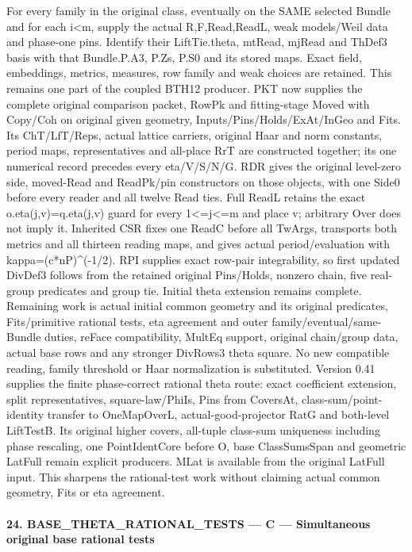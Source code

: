 \documentclass[11pt,a4paper]{article}
\numberwithin{equation}{section}
\theoremstyle{remark}\newtheorem{remark}[theorem]{Remark}
\begin{document}
For every family in the original class, eventually on the SAME selected Bundle and for each i<m, supply the actual R,F,Read,ReadL, weak models/Weil data and phase-one pins. Identify their LiftTie.theta, mtRead, mjRead and ThDef3 basis with that Bundle.P.A3, P.Zs, P.S0 and its stored maps. Exact field, embeddings, metrics, measures, row family and weak choices are retained. This remains one part of the coupled BTH12 producer. PKT now supplies the complete original comparison packet, RowPk and fitting-stage Moved with Copy/Coh on original given geometry, Inputs/Pins/Holds/ExAt/InGeo and Fits. Its ChT/LfT/Reps, actual lattice carriers, original Haar and norm constants, period maps, representatives and all-place RrT are constructed together; its one numerical record precedes every eta/V/S/N/G. RDR gives the original level-zero side, moved-Read and ReadPk/pin constructors on those objects, with one Side0 before every reader and all twelve Read ties. Full ReadL retains the exact o.eta(j,v)=q.eta(j,v) guard for every 1<=j<=m and place v; arbitrary Over does not imply it. Inherited CSR fixes one ReadC before all TwArgs, transports both metrics and all thirteen reading maps, and gives actual period/evaluation with kappa=(c*nP)\textasciicircum{}(-1/2). RPI supplies exact row-pair integrability, so first updated DivDef3 follows from the retained original Pins/Holds, nonzero chain, five real-group predicates and group tie. Initial theta extension remains complete. Remaining work is actual initial common geometry and its original predicates, Fits/primitive rational tests, eta agreement and outer family/eventual/same-Bundle duties, reFace compatibility, MultEq support, original chain/group data, actual base rows and any stronger DivRows3 theta square. No new compatible reading, family threshold or Haar normalization is substituted. Version 0.41 supplies the finite phase-correct rational theta route: exact coefficient extension, split representatives, square-law/PhiIs, Pins from CoversAt, class-sum/point-identity transfer to OneMapOverL, actual-good-projector RatG and both-level LiftTestB. Its original higher covers, all-tuple class-sum uniqueness including phase rescaling, one PointIdentCore before O, base ClassSumsSpan and geometric LatFull remain explicit producers. MLat is available from the original LatFull input. This sharpens the rational-test work without claiming actual common geometry, Fits or eta agreement.



\paragraph{24. BASE\_\allowbreak THETA\_\allowbreak RATIONAL\_\allowbreak TESTS — C — Simultaneous original base rational tests}
\end{document}
